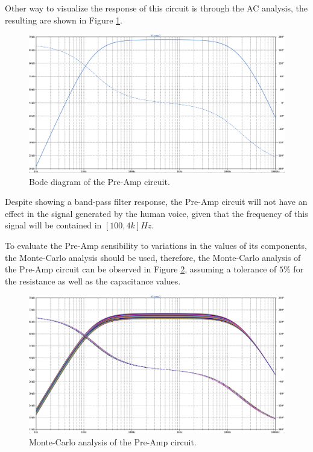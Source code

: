 Other way to visualize the response of this circuit is through the AC analysis, the resulting are shown in Figure \ref{fig:SimAmpFreq}.

\begin{figure}[H]
    \centering
    \includegraphics*[scale = 0.25]{Images/SimAmpFreq.png}
    \caption{Bode diagram of the Pre-Amp circuit.}
    \label{fig:SimAmpFreq}
\end{figure}

Despite showing a band-pass filter response, the Pre-Amp circuit will not have an effect in the signal generated by the human voice, given that the frequency of this signal will be contained in $[100, 4k]Hz$.

To evaluate the Pre-Amp sensibility to variations in the values of its components, the Monte-Carlo analysis should be used, therefore, the Monte-Carlo analysis of the Pre-Amp circuit can be observed in Figure \ref{fig:Monte-carloPreAmp}, assuming a tolerance of $5\%$ for the resistance as well as the capacitance values.

\begin{figure}[H]
    \centering
    \includegraphics*[scale = 0.25]{Images/Monte-carloPreAmp.png}
    \caption{Monte-Carlo analysis of the Pre-Amp circuit.}
    \label{fig:Monte-carloPreAmp}
\end{figure}

